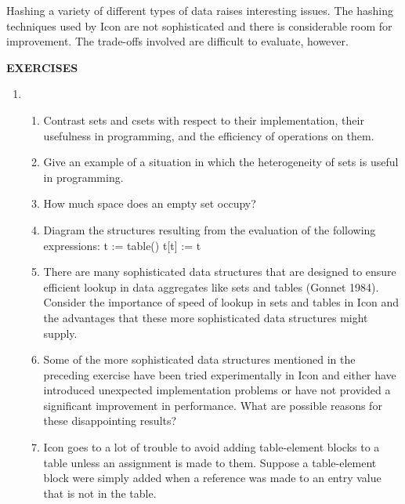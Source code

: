 Hashing a variety of different types of data raises interesting
issues. The hashing techniques used by Icon are not sophisticated and
there is considerable room for improvement. The trade-offs involved
are difficult to evaluate, however.

\bigskip

\noindent\textbf{EXERCISES}

\liststyleLvii
\begin{enumerate}
\item \begin{enumerate}

\item Contrast sets and csets with respect to their implementation,
their usefulness in programming, and the efficiency of operations on
them.

\item Give an example of a situation in which the heterogeneity of
sets is useful in programming.

\item How much space does an empty set occupy?

\item Diagram the structures resulting from the evaluation of the
following expressions:\newline
 t := table()\newline
 t[t] := t

\item There are many sophisticated data structures that are designed
to ensure efficient lookup in data aggregates like sets and tables
(Gonnet 1984). Consider the importance of speed of lookup in sets and
tables in Icon and the advantages that these more sophisticated data
structures might supply.

\item Some of the more sophisticated data structures mentioned in the
preceding exercise have been tried experimentally in Icon and either
have introduced unexpected implementation problems or have not
provided a significant improvement in performance. What are possible
reasons for these disappointing results?

\item Icon goes to a lot of trouble to avoid adding table-element
blocks to a table unless an assignment is made to them.  Suppose a
table-element block were simply added when a reference was made to an
entry value that is not in the table.
\end{enumerate}
\end{enumerate}
